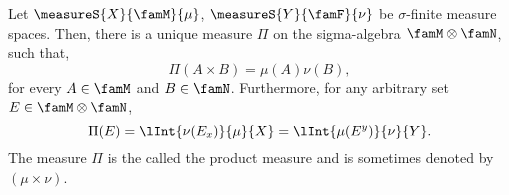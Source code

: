 \begin{Theorem}
    Let $\measureS{X}{\famM}{\mu}$, $\measureS{Y}{\famF}{\nu}$ be $\sigma$-finite measure spaces. Then, there
    is a unique measure $\Pi$ on the sigma-algebra $\famM\otimes\famN$, such that,
    \[\Pi(A\times B) = \mu(A)\nu(B),\]
    for every $A \in \famM$ and $B \in \famN$. Furthermore, for any arbitrary set $E \in \famM\otimes\famN$,
    \[\Pi(E) = \lInt{\nu(E_x)}{\mu}{X} = \lInt{\mu(E^{y})}{\nu}{Y}.\]
    The measure $\Pi$ is the called the product measure and is sometimes denoted by $(\mu\times \nu)$.

\end{Theorem}

